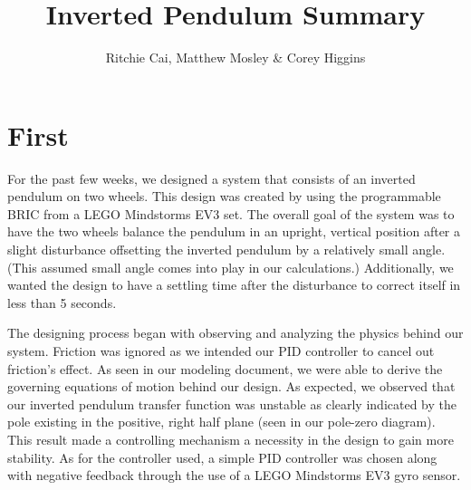\documentclass{notes}
\author{Ritchie Cai, Matthew Mosley \& Corey Higgins}
\title{Inverted Pendulum Summary}
\begin{document}
\maketitle 
\section{First}
For the past few weeks, we designed a system that consists of an inverted pendulum on two wheels. This design was created by using the programmable BRIC from a LEGO Mindstorms EV3 set. The overall goal of the system was to have the two wheels balance the pendulum in an upright, vertical position after a slight disturbance offsetting the inverted pendulum by a relatively small angle. (This assumed small angle comes into play in our calculations.) Additionally, we wanted the design to have a settling time after the disturbance to correct itself in less than 5 seconds.
   
The designing process began with observing and analyzing the physics behind our system. Friction was ignored as we intended our PID controller to cancel out friction's effect. As seen in our modeling document, we were able to derive the governing equations of motion behind our design. As expected, we observed that our inverted pendulum transfer function was unstable as clearly indicated by the pole existing in the positive, right half plane (seen in our pole-zero diagram). This result made a controlling mechanism a necessity in the design to gain more stability. As for the controller used, a simple PID controller was chosen along with negative feedback through the use of a LEGO Mindstorms EV3 gyro sensor.          
\end{document}
